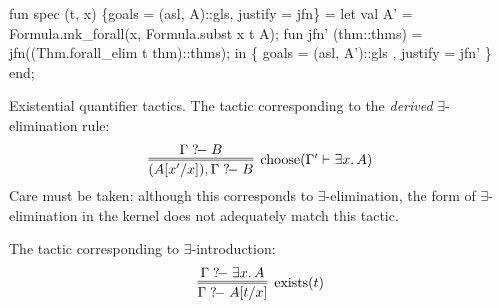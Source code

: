 fun spec (t, x) \{goals = (asl, A)::gls, justify = jfn\} =
  let
    val A' = Formula.mk_forall(x, Formula.subst x t A);
    fun jfn' (thm::thms) =
      jfn((Thm.forall_elim t thm)::thms);
  in
    \{ goals = (asl, A')::gls
    , justify = jfn' \}
  end;
\eatline
{}\nwendcode{}\nwdocspar
\begin{node}
Existential quantifier tactics. The tactic corresponding to the
\emph{derived} $\exists$-elimination rule:
\begin{equation}
\vcenter{\infer=[\mbox{choose}(\Gamma'\vdash\exists x\ldotp A)]{(A[x'/x]),\Gamma\gdash B}{\Gamma\gdash B}}
\end{equation}
Care must be taken: although this corresponds to
$\exists$-elimination, the form of $\exists$-elimination in the kernel
does not adequately match this tactic.

The tactic corresponding to $\exists$-introduction:
\begin{equation}
\vcenter{\infer=[\mbox{exists}(t)]{\Gamma\gdash A[t/x]}{\Gamma\gdash\exists x\ldotp A}}
\end{equation}
\end{node}

